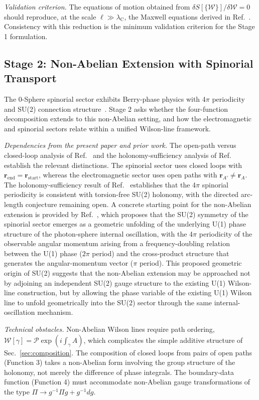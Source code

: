 \documentclass[%
 reprint, amsmath,amssymb, aps, prb, ]{revtex4-2}
\numberwithin{equation}{section}
\newcommand{\WL}{\mathcal{W}}
\newcommand{\lambdaC}{\lambda_{\mathrm{C}}}
\begin{document}
\textit{Validation criterion.} The equations of motion obtained from $\delta S[\{\WL\}] / \delta \WL = 0$ should reproduce, at the scale $\ell \gg \lambdaC$, the Maxwell equations derived in Ref.~\cite{hanamura54}. Consistency with this reduction is the minimum validation criterion for the Stage 1 formulation.

\subsection{Stage 2: Non-Abelian Extension with Spinorial Transport}
\label{app:stage2}

The 0-Sphere spinorial sector exhibits Berry-phase physics with 4$\pi$ periodicity and SU(2) connection structure~\cite{hanamura26, hanamura29, hanamura45}. Stage 2 asks whether the four-function decomposition extends to this non-Abelian setting, and how the electromagnetic and spinorial sectors relate within a unified Wilson-line framework.

\textit{Dependencies from the present paper and prior work.} The open-path versus closed-loop analysis of Ref.~\cite{hanamura43} and the holonomy-sufficiency analysis of Ref.~\cite{hanamura45} establish the relevant distinctions. The spinorial sector uses closed loops with $\mathbf{r}_{\text{end}} = \mathbf{r}_{\text{start}}$, whereas the electromagnetic sector uses open paths with $\mathbf{r}_{A'} \neq \mathbf{r}_A$. The holonomy-sufficiency result of Ref.~\cite{hanamura45} establishes that the 4$\pi$ spinorial periodicity is consistent with torsion-free SU(2) holonomy, with the directed arc-length conjecture remaining open. A concrete starting point for the non-Abelian extension is provided by Ref.~\cite{hanamura19}, which proposes that the SU(2) symmetry of the spinorial sector emerges as a geometric unfolding of the underlying U(1) phase structure of the photon-sphere internal oscillation, with the 4$\pi$ periodicity of the observable angular momentum arising from a frequency-doubling relation between the U(1) phase ($2\pi$ period) and the cross-product structure that generates the angular-momentum vector ($\pi$ period). This proposed geometric origin of SU(2) suggests that the non-Abelian extension may be approached not by adjoining an independent SU(2) gauge structure to the existing U(1) Wilson-line construction, but by allowing the phase variable of the existing U(1) Wilson line to unfold geometrically into the SU(2) sector through the same internal-oscillation mechanism.

\textit{Technical obstacles.} Non-Abelian Wilson lines require path ordering, $\WL[\gamma] = \mathcal{P}\exp(i\int_\gamma A)$, which complicates the simple additive structure of Sec.~\ref{sec:composition}. The composition of closed loops from pairs of open paths (Function 3) takes a non-Abelian form involving the group structure of the holonomy, not merely the difference of phase integrals. The boundary-data function (Function 4) must accommodate non-Abelian gauge transformations of the type $\Pi \to g^{-1} \Pi g + g^{-1} d g$.
\end{document}
